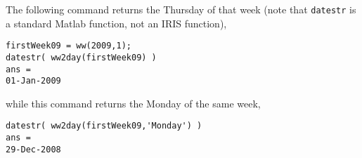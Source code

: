 The following command returns the Thursday of that week (note that
\texttt{datestr} is a standard Matlab function, not an IRIS function),

\begin{verbatim}
firstWeek09 = ww(2009,1);
datestr( ww2day(firstWeek09) )
ans =
01-Jan-2009
\end{verbatim}

while this command returns the Monday of the same week,

\begin{verbatim}
datestr( ww2day(firstWeek09,'Monday') )
ans =
29-Dec-2008
\end{verbatim}



